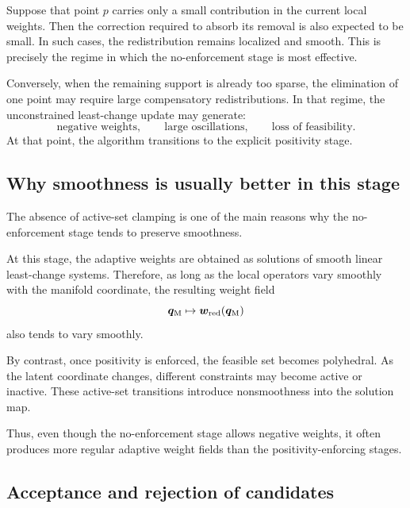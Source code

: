 \documentclass[11pt,a4paper]{article}
\begin{document}
Suppose that point $p$ carries only a small contribution in the current local
weights. Then the correction required to absorb its removal is also expected to
be small. In such cases, the redistribution remains localized and smooth. This
is precisely the regime in which the no-enforcement stage is most effective.

Conversely, when the remaining support is already too sparse, the elimination of
one point may require large compensatory redistributions. In that regime, the
unconstrained least-change update may generate:
\[
        \text{negative weights},
        \qquad
        \text{large oscillations},
        \qquad
        \text{loss of feasibility}.
\]
At that point, the algorithm transitions to the explicit positivity stage.

\subsection{Why smoothness is usually better in this stage}

The absence of active-set clamping is one of the main reasons why the
no-enforcement stage tends to preserve smoothness.

At this stage, the adaptive weights are obtained as solutions of smooth linear
least-change systems. Therefore, as long as the local operators vary smoothly
with the manifold coordinate, the resulting weight field
\[
        \bm q_{\mathrm{M}}\mapsto\bm w_{\mathrm{red}}(\bm q_{\mathrm{M}})
\]
also tends to vary smoothly.

By contrast, once positivity is enforced, the feasible set becomes polyhedral.
As the latent coordinate changes, different constraints may become active or
inactive. These active-set transitions introduce nonsmoothness into the
solution map.

Thus, even though the no-enforcement stage allows negative weights, it often
produces more regular adaptive weight fields than the positivity-enforcing
stages.

\subsection{Acceptance and rejection of candidates}
\end{document}
